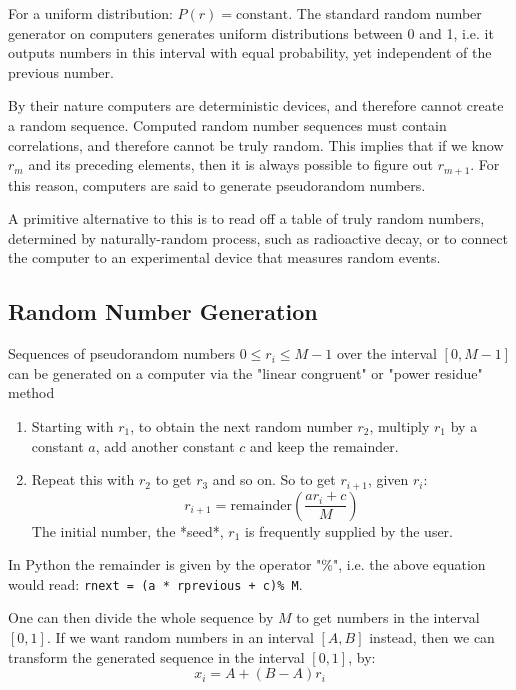 \documentclass[../../../main.tex]{subfiles}
\begin{document}
For a uniform distribution: $P(r) = \mathrm{constant}$. 
The standard random number generator on computers generates uniform distributions between 0 and 1, i.e. it outputs numbers in this interval with equal probability, yet independent of the previous number. 

By their nature computers are deterministic devices, and therefore cannot create a random sequence. 
Computed random number sequences must contain correlations, and therefore cannot be truly random. 
This implies that if we know $r_m$ and its preceding elements, then it is always possible to figure out $r_{m+1}$. 
For this reason, computers are said to generate pseudorandom numbers. 

A primitive alternative to this is to read off a table of truly random numbers, determined by  naturally-random process, such as radioactive decay, or to connect the computer to an experimental device that measures random events. 

\subsection{Random Number Generation}

Sequences of pseudorandom numbers $0 \leq r_i \leq M-1$ over the interval $[0, M-1]$ can be generated on a computer via the "linear congruent" or "power residue" method
\begin{enumerate}
    \item Starting with $r_1$, to obtain the next random number $r_2$, multiply $r_1$ by a constant $a$, add another constant $c$ and keep the remainder. 
    \item Repeat this with $r_2$ to get $r_3$ and so on. So to get $r_{i+1}$, given $r_i$: 
    \begin{equation*}
        r_{i+1} = \mathrm{remainder} \left( \frac{a r_i + c}{M} \right)
    \end{equation*}
    The initial number, the *seed*, $r_1$ is frequently supplied by the user. 
\end{enumerate}

In Python the remainder is given by the operator "\%", i.e. the above equation would read: \verb|rnext = (a * rprevious + c)% M|. 

One can then divide the whole sequence by $M$ to get numbers in the interval $[0,1]$. 
If we want random numbers in an interval $[A,B]$ instead, then we can transform the generated sequence in the interval $[0,1]$, by:
\begin{equation*}
    x_i = A + (B-A) r_i   
\end{equation*}
\end{document}
